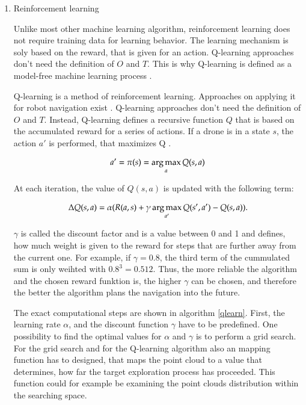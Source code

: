 	\begin{enumerate}
	
	\item{Reinforcement learning}
	
	Unlike most other machine learning algorithm, reinforcement learning does not require training data for learning behavior. The learning mechanism is soly based 
	on the reward, that is given for an action. %
	Q-learning approaches don't need the definition of $O$ and $T$. This is why Q-learning is defined as a model-free machine learning process \cite{deep}. 
	
	Q-learning is a method of reinforcement learning. Approaches on applying it for robot navigation exist \cite{accurat}\cite{deep}\cite{lopez}. Q-learning approaches don't need the definition of $O$ and $T$.
	Instead, Q-learning defines a recursive function $Q$ that is based on the accumulated reward for a series of actions. If a drone is in a state $s$, the action $a'$ is performed, 
	that maximizes Q \cite{lopez}. 
	
	$$a' = \pi(s) = \mathop{\mathrm{arg\,max}}_{a} Q(s,a)$$
	
	At each iteration, the value of $Q(s,a)$ is updated with the following term: 
	
	\begin{equation}\label{update}
    \Delta Q(s,a) = \alpha(R(a,s) + 	\gamma \mathop{\mathrm{arg\,max}}_{a'}Q(s', a') - Q(s, a)).
	\end{equation}
	
	$\gamma$ is called the discount factor and is a value between 0 and 1 and defines, how much weight is given to the reward for steps that are further away from the current one. 
	For example, if $\gamma = 0.8$, the third term of the cummulated sum is only weihted with ${0.8}^3 = 0.512$. Thus, the more reliable the algorithm 
	and the chosen reward funktion is, the higher $\gamma$ can be chosen, and therefore the better the algorithm plans the navigation into the future. 
	
	The exact computational steps are shown in algorithm \ref{qlearn}. 
	First, the learning rate $\alpha$, and the discount function $\gamma$ have to be predefined. One possibility to find the optimal values for $\alpha$ and 
    $\gamma$ is to perform a grid search. For the grid search and for the Q-learning algorithm also an mapping function has to designed, that maps 
	the point cloud to a value that determines, how far the target exploration process has proceeded. This function could for example be examining the point clouds 
	distribution within the searching space. 
	

\end{enumerate}
